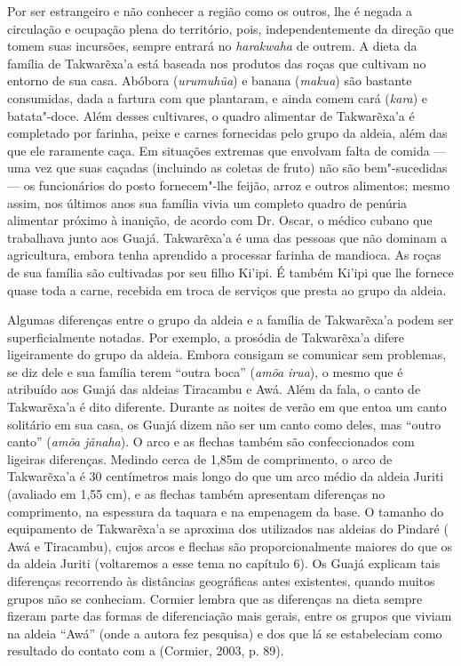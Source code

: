 Por ser estrangeiro e não conhecer a região como os outros, lhe é negada
a circulação e ocupação plena do território, pois, independentemente da
direção que tomem suas incursões, sempre entrará no \emph{harakwaha} de
outrem. A dieta da família de Takwarẽxa'a está baseada nos produtos das
roças que cultivam no entorno de sua casa. Abóbora (\emph{urumuhũa}) e
banana (\emph{makua}) são bastante consumidas, dada a fartura com que
plantaram, e ainda comem cará (\emph{kara}) e batata"-doce. Além desses
cultivares, o quadro alimentar de Takwarẽxa'a é completado por farinha,
peixe e carnes fornecidas pelo grupo da aldeia, além das que ele
raramente caça. Em situações extremas que envolvam falta de comida --- uma
vez que suas caçadas (incluindo as coletas de fruto) não são
bem"-sucedidas --- os funcionários do posto fornecem"-lhe feijão, arroz e
outros alimentos; mesmo assim, nos últimos anos sua família vivia um
completo quadro de penúria alimentar próximo à inanição, de acordo com
Dr. Oscar, o médico cubano que trabalhava junto aos Guajá. Takwarẽxa'a é
uma das pessoas que não dominam a agricultura, embora tenha aprendido a
processar farinha de mandioca. As roças de sua família são cultivadas
por seu filho Ki'ipi. É também Ki'ipi que lhe fornece quase toda a
carne, recebida em troca de serviços que presta ao grupo da aldeia.

Algumas diferenças entre o grupo da aldeia e a família de Takwarẽxa'a
podem ser superficialmente notadas. Por exemplo, a prosódia de
Takwarẽxa'a difere ligeiramente do grupo da aldeia. Embora consigam se
comunicar sem problemas, se diz dele e sua família terem ``outra boca''
(\emph{amõa} \emph{irua}), o mesmo que é atribuído aos Guajá das aldeias
Tiracambu e Awá. Além da fala, o canto de Takwarẽxa'a é dito diferente.
Durante as noites de verão em que entoa um canto solitário em sua casa,
os Guajá dizem não ser um canto como deles, mas ``outro canto''
(\emph{amõa jãnaha}). O arco e as flechas também são confeccionados com
ligeiras diferenças. Medindo cerca de 1,85m de comprimento, o arco de
Takwarẽxa'a é 30 centímetros mais longo do que um arco médio da aldeia
Juriti (avaliado em 1,55 cm), e as flechas também apresentam diferenças
no comprimento, na espessura da taquara e na empenagem da base. O
tamanho do equipamento de Takwarẽxa'a se aproxima dos utilizados nas
aldeias do Pindaré ( Awá e  Tiracambu), cujos arcos e flechas são
proporcionalmente maiores do que os da aldeia Juriti (voltaremos a esse
tema no capítulo 6). Os Guajá explicam tais diferenças recorrendo às
distâncias geográficas antes existentes, quando muitos grupos não se
conheciam. Cormier lembra que as diferenças na dieta sempre fizeram
parte das formas de diferenciação mais gerais, entre os grupos que
viviam na aldeia ``Awá'' (onde a autora fez pesquisa) e dos que lá se
estabeleciam como resultado do contato com a  (Cormier, 2003, p.
89).


